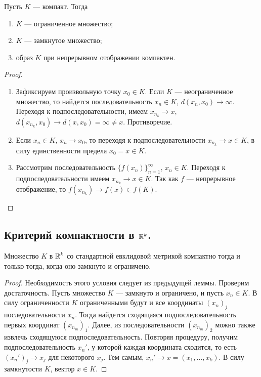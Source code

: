 \documentclass[a4paper]{article}
\theoremstyle{named}
\begin{document}
    \begin{lemma*}
        Пусть $K$ --- компакт. Тогда
        \begin{enumerate}
        \item
            $K$ --- ограниченное множество;

        \item
            $K$ --- замкнутое множество;

        \item
            образ $K$ при непрерывном отображении компактен.
        \end{enumerate}
    \end{lemma*}

    \begin{proof}
        ~

        \begin{enumerate}
        \item
            Зафиксируем произвольную точку $x_0 \in K$. Если $K$ --- неограниченное множество, то найдется последовательность $x_n \in K$, $d(x_n, x_0) \to \infty$. Переходя к подпоследовательности, имеем $x_{n_k} \to x$, $d(x_{n_k}, x_0) \to d(x, x_0) = \infty \neq x$. Противоречие.

        \item
            Если $x_n \in K$, $x_n \to x_0$, то переходя к подпоследовательности $x_{n_k} \to x \in K$, в силу единственности предела $x_0 = x \in K$.

        \item
            Рассмотрим последовательность $\{f(x_n)\}_{n = 1}^{\infty}$, $x_n \in K$. Переходя к подпоследовательности имеем $x_{n_k} \to x \in K$. Так как $f$ --- непрерывное отображение, то $f(x_{n_k}) \to f(x) \in f(K)$.
        \end{enumerate}
    \end{proof}

    \subsection{Критерий компактности в $\mathbb{R}^k$.}

    \begin{proposal*}
        Множество $K$ в $\mathbb{R}^k$ со стандартной евклидовой метрикой компактно тогда и только тогда, когда оно замкнуто и ограничено.
    \end{proposal*}

    \begin{proof}
        Необходимость этого условия следует из предыдущей леммы. Проверим достаточность. Пусть множество $K$ --- замкнуто и ограничено, и пусть $x_n \in K$. В силу ограниченности $K$ ограниченными будут и все координаты $(x_n)_j$ последовательности $x_n$. Тогда найдется сходящаяся подпоследовательность первых координат $(x_{n_m})_1$. Далее, из последовательности $(x_{n_m})_2$ можно также извлечь сходящуюся подпоследовательность. Повторяя процедуру, получим подпоследовательность $x_n'$, у которой каждая координата сходится, то есть $(x_n')_j \to x_j$ для некоторого $x_j$. Тем самым, $x_n' \to x = (x_1, \dots, x_k)$. В силу замкнутости $K$, вектор $x \in K$.
    \end{proof}
\end{document}
